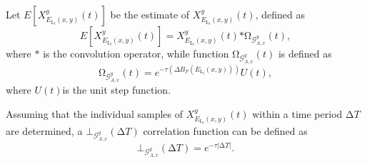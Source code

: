\documentclass[11pt]{article}%
\begin{document}
 Let $E\left[X^y_{E_{{\mathrm{L}}_l}\left(x,y\right)}\left(t\right)\right]$ be the estimate of $X^y_{E_{{\mathrm{L}}_l}\left(x,y\right)}\left(t\right)$, defined as
\begin{equation} \label{10)} 
E\left[X^y_{E_{{\mathrm{L}}_l}\left(x,y\right)}\left(t\right)\right]\mathrm{=}X^y_{E_{{\mathrm{L}}_l}\left(x,y\right)}\left(t\right)\mathrm{*}{\mathrm{\Omega }}_{{\mathcal{G}}^y_{A,x}}\left(t\right),                                                           
\end{equation} 
where $\mathrm{*}$ is the convolution operator, while function ${\mathrm{\Omega }}_{{\mathcal{G}}^y_{A,x}}\left(t\right)$ is defined as
\begin{equation} \label{ZEqnNum268197} 
{\mathrm{\Omega }}_{{\mathcal{G}}^y_{A,x}}\left(t\right)\mathrm{=}e^{\mathrm{-}\tau \left(\mathit{\Delta}B_F\left(E_{{\mathrm{L}}_l}\left(x,y\right)\right)\right)}U\left(t\right),                                                                      
\end{equation} 
where $U\left(t\right)$is the unit step function. 

Assuming that the individual samples of $X^y_{E_{{\mathrm{L}}_l}\left(x,y\right)}\left(t\right)$ within a time period $\mathrm{\Delta }T$ are determined, a ${\mathrm{\bot }}_{{\mathcal{G}}^y_{A,x}}\left(\mathrm{\Delta }T\right)$  correlation function can be defined as
\begin{equation} \label{ZEqnNum949043} 
{\mathrm{\bot }}_{{\mathcal{G}}^y_{A,x}}\left(\mathrm{\Delta }T\right)\mathrm{=}e^{\mathrm{-}\tau \left|\mathrm{\Delta }T\right|}.                                                                            
\end{equation} 
\end{document}
